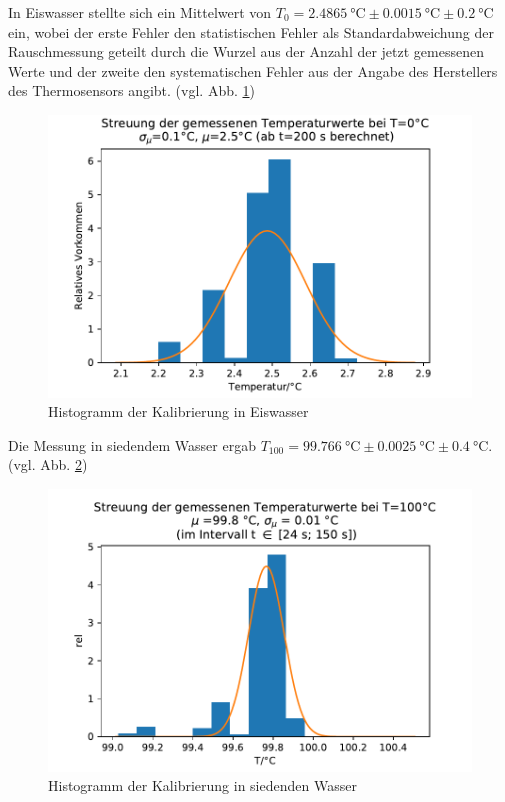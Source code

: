 \documentclass[]{article}
\begin{document}
In Eiswasser stellte sich ein Mittelwert von $T_0=\SI{2.4865}{\celsius} \pm \SI{0.0015}{\celsius} \pm \SI{0.2}{\celsius}$ ein, wobei der erste Fehler den statistischen Fehler als Standardabweichung der Rauschmessung geteilt durch die Wurzel aus der Anzahl der jetzt gemessenen Werte und der zweite den systematischen Fehler aus der Angabe des Herstellers des Thermosensors angibt.  (vgl. Abb. \ref{K_T0_histo})\\
\begin{figure}
	\begin{center}
		\includegraphics[scale=0.9]{Images/Kalib_T_0_histo.pdf}
		\caption{Histogramm der Kalibrierung in Eiswasser}
		\label{K_T0_histo}
	\end{center}
\end{figure}
Die Messung in siedendem Wasser ergab $T_{100}=\SI{99.766}{\celsius} \pm \SI{0.0025}{\celsius} \pm \SI{0.4}{\celsius}$. (vgl. Abb. \ref{K_T100_histo})\\
\begin{figure}
	\begin{center}
		\includegraphics[scale=0.9]{Images/Kalib_T_histo_100}
		\caption{Histogramm der Kalibrierung in siedenden Wasser}
		\label{K_T100_histo}
	\end{center}
\end{figure}
\end{document}
